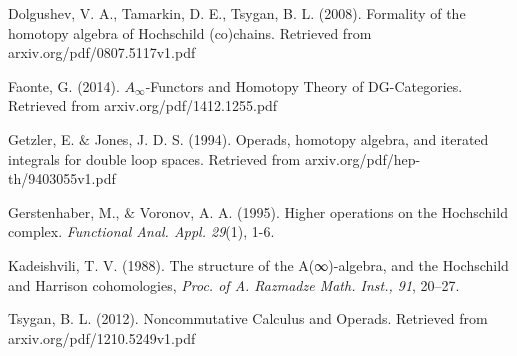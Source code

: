 
% 


\begin{thebibliography}{}

 Dolgushev, V. A., Tamarkin, D. E., Tsygan, B. L. (2008). Formality of the homotopy algebra of Hochschild (co)chains. Retrieved from arxiv.org/pdf/0807.5117v1.pdf

 Faonte, G. (2014). $A_\infty$-Functors and Homotopy Theory of DG-Categories. Retrieved from arxiv.org/pdf/1412.1255.pdf

 Getzler, E. $\&$ Jones, J. D. S. (1994). Operads, homotopy algebra, and iterated integrals for double loop spaces. Retrieved from arxiv.org/pdf/hep-th/9403055v1.pdf

 Gerstenhaber, M., $\&$ Voronov, A. A. (1995). Higher operations on the Hochschild complex. \textit{Functional Anal. Appl. 29}(1), 1-6.



 Kadeishvili, T. V. (1988). The structure of the A(∞)-algebra, and the Hochschild and Harrison cohomologies, \textit{Proc. of A. Razmadze Math. Inst., 91}, 20–27.


 Tsygan, B. L. (2012). Noncommutative Calculus and Operads. Retrieved from arxiv.org/pdf/1210.5249v1.pdf

\end{thebibliography}